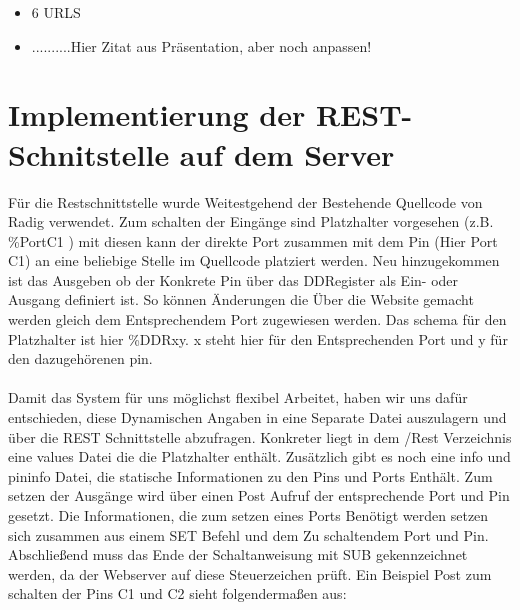 \begin{itemize}
	\item 6 URLS
	\item ..........Hier Zitat aus Präsentation, aber noch anpassen!
\end{itemize}
	
\section{Implementierung der REST-Schnitstelle auf dem Server}

Für die Restschnittstelle wurde Weitestgehend der Bestehende Quellcode von Radig
verwendet.
Zum schalten der Eingänge sind Platzhalter vorgesehen (z.B. \%PortC1 ) mit
diesen kann der direkte Port zusammen mit dem Pin (Hier Port C1) an eine
beliebige Stelle im Quellcode platziert werden. Neu hinzugekommen ist das
Ausgeben ob der Konkrete Pin über das DDRegister als Ein- oder Ausgang definiert ist.
So können Änderungen die Über die Website gemacht werden gleich dem
Entsprechendem Port zugewiesen werden. Das schema für den Platzhalter ist hier
\%DDRxy. x steht hier für den Entsprechenden Port und y für den dazugehörenen
pin.\\
\\
Damit das System für uns möglichst flexibel Arbeitet, haben wir uns dafür
entschieden, diese Dynamischen Angaben in eine Separate Datei auszulagern und über die REST Schnittstelle abzufragen. Konkreter liegt in dem /Rest Verzeichnis
eine \textrm{values} Datei die die Platzhalter enthält. Zusätzlich gibt es noch eine
\textrm{info} und \textrm{pininfo} Datei, die statische Informationen zu den
Pins und Ports Enthält.
Zum setzen der Ausgänge wird über einen Post Aufruf der entsprechende Port und
Pin gesetzt. Die Informationen, die zum setzen eines Ports Benötigt werden
setzen sich zusammen aus einem \textrm{SET} Befehl und dem Zu schaltendem Port
und Pin. Abschließend muss das Ende der Schaltanweisung mit \textrm{SUB}
gekennzeichnet werden, da der Webserver auf diese Steuerzeichen prüft. Ein
Beispiel Post zum schalten der Pins C1 und C2 sieht folgendermaßen aus: \\

